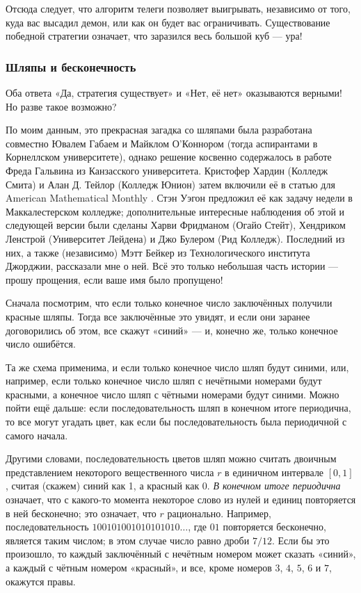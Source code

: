 Отсюда следует, что алгоритм телеги позволяет выигрывать, независимо от того, куда вас высадил демон, или как он будет вас ограничивать.
Существование победной стратегии означает, что заразился весь большой куб --- ура!

\subsubsection*{Шляпы и бесконечность}

Оба ответа «Да, стратегия существует» и «Нет, её нет» оказываются верными!
Но разве такое возможно?

По моим данным, это прекрасная загадка со шляпами была разработана совместно Ювалем Габаем и Майклом О'Коннором (тогда аспирантами в Корнеллском университете), однако решение косвенно содержалось в работе Фреда Гальвина из Канзасского университета.
Кристофер Хардин (Колледж Смита) и Алан Д. Тейлор (Колледж Юнион) затем включили её в статью для American Mathematical Monthly \cite{36}.
Стэн Уэгон предложил её как задачу недели в Маккалестерском колледже; дополнительные интересные наблюдения об этой и следующей версии были сделаны Харви Фридманом (Огайо Стейт), Хендриком Ленстрой (Университет Лейдена) и Джо Булером (Рид Колледж).
Последний из них, а также (независимо) Мэтт Бейкер из Технологического института Джорджии, рассказали мне о ней.
Всё это только небольшая часть истории --- прошу прощения, если ваше имя было пропущено!

Сначала посмотрим, что если только конечное число заключённых получили красные шляпы.
Тогда все заключённые это увидят, и если они заранее договорились об этом, все скажут «синий» --- и, конечно же, только конечное число ошибётся.

Та же схема применима, и если только конечное число шляп будут синими, или, например, если только конечное число шляп с нечётными номерами будут красными, а конечное число шляп с чётными номерами будут синими.
Можно пойти ещё дальше: если последовательность шляп в конечном итоге периодична, то все могут угадать цвет, как если бы последовательность была периодичной с самого начала.

Другими словами, последовательность цветов шляп можно считать двоичным представлением некоторого вещественного числа $r$ в единичном интервале $[0,1]$, считая (скажем) синий как 1, а красный как 0.
\emph{В конечном итоге периодична} означает, что с какого-то момента некоторое слово из нулей и единиц повторяется в ней бесконечно;
это означает, что $r$ рационально.
Например, последовательность $100101001010101010\dots$, где $01$ повторяется бесконечно, является таким числом; в этом случае число равно дроби $7/12$.
Если бы это произошло, то каждый заключённый с нечётным номером может сказать «синий», а каждый с чётным номером «красный», и все, кроме номеров $3$, $4$, $5$, $6$ и $7$, окажутся правы.

